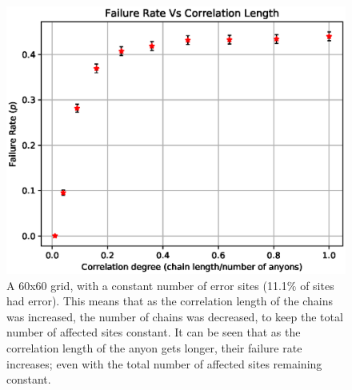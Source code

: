 \begin{figure}[htpb]
	\centering
	\includegraphics[scale = 0.7]{figs/pvscorr.eps}
	\caption{A 60x60 grid, with a constant number of error sites (11.1$\%$ of sites had error). This means that as the correlation length of the chains was increased, the number of chains was decreased, to keep the total number of affected sites constant. It can be seen that as the correlation length of the anyon gets longer, their failure rate increases; even with the total number of affected sites remaining constant. }
	\label{fig:IncreasingCorr}

\end{figure}



